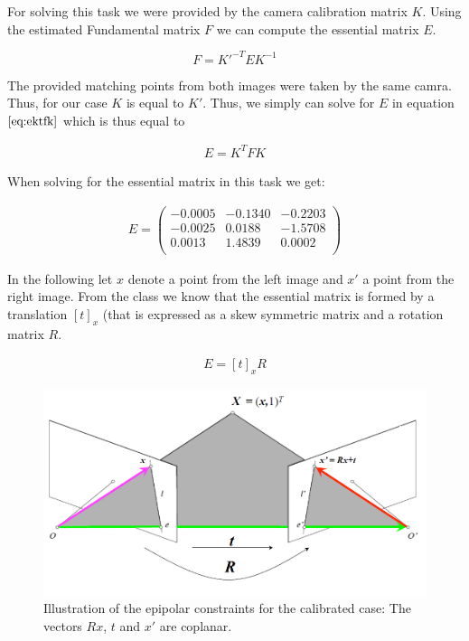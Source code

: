 \documentclass{paper}
\begin{document}
For solving this task we were provided by the camera calibration matrix $K$.  
Using the estimated Fundamental matrix $F$ we can compute the essential matrix $E$.

\begin{equation}
    F = K'^{-T} E K^{-1}
\label{eq:ektfk}
\end{equation}

The provided matching points from both images were taken by the same camra. Thus, for our case $K$ is equal to $K'$. Thus, we simply can solve for $E$ in equation $\ref{eq:ektfk}$ which is thus equal to

\begin{align}
    E = K^{T} F K
\end{align}

When solving for the essential matrix in this task we get:

\begin{align}
E = 
\left(\begin{array}{rrr}
   -0.0005  & -0.1340 &  -0.2203 \\
   -0.0025  &  0.0188 &  -1.5708 \\
    0.0013  &  1.4839 &   0.0002 \\
\end{array} \right)
\end{align}

In the following let $x$ denote a point from the left image and $x'$ a point from the right image. From the class we know that the essential matrix is formed by a translation $[t]_x$ (that is expressed as a skew symmetric matrix and a rotation matrix $R$. 

\begin{align}
    E = [t]_x R 
\end{align}

\begin{figure}[h]
    \centering
    \includegraphics[width=\textwidth]{figures/epipol_const_cal_case}
    \caption{Illustration of the epipolar constraints for the calibrated case: The vectors $Rx$, $t$ and $x'$ are coplanar.}
    \label{fig:epipolar_constraints}
\end{figure}
\end{document}
